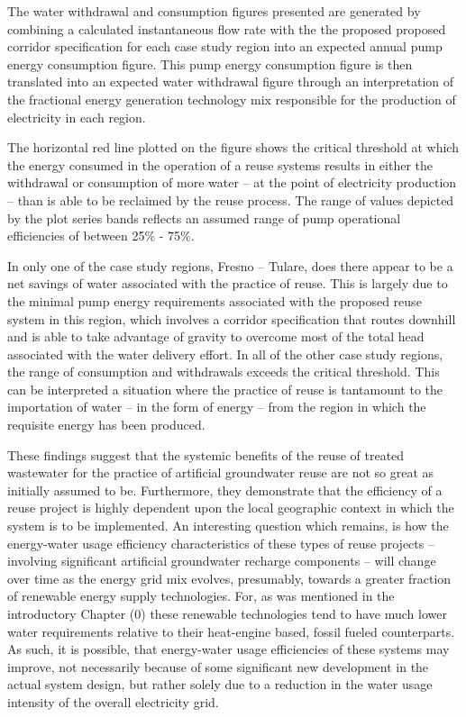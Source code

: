 The water withdrawal and consumption figures presented are generated by combining a calculated instantaneous flow rate with the the proposed proposed corridor specification for each case study region into an expected annual pump energy consumption figure. This pump energy consumption figure is then translated into an expected water withdrawal figure through an interpretation of the fractional energy generation technology mix responsible for the production of electricity in each region. 

The horizontal red line plotted on the figure shows the critical threshold at which the energy consumed in the operation of a reuse systems results in either the withdrawal or consumption of more water -- at the point of electricity production -- than is able to be reclaimed by the reuse process. The range of values depicted by the plot series bands reflects an assumed range of pump operational efficiencies of between 25\% - 75\%.

In only one of the case study regions, Fresno -- Tulare, does there appear to be a net savings of water associated with the practice of reuse. This is largely due to the minimal pump energy requirements associated with the proposed reuse system in this region, which involves a corridor specification that routes downhill and is able to take advantage of gravity to overcome most of the total head associated with the water delivery effort. In all of the other case study regions, the range of consumption and withdrawals exceeds the critical threshold. This can be interpreted a situation where the practice of reuse is tantamount to the importation of water -- in the form of energy -- from the region in which the requisite energy has been produced.

These findings suggest that the systemic benefits of the reuse of treated wastewater for the practice of artificial groundwater reuse are not so great as initially assumed to be. Furthermore, they demonstrate that the efficiency of a reuse project is highly dependent upon the local geographic context in which the system is to be implemented. An interesting question which remains, is how the energy-water usage efficiency characteristics of these types of reuse projects -- involving significant artificial groundwater recharge components -- will change over time as the energy grid mix evolves, presumably, towards a greater fraction of renewable energy supply technologies. For, as was mentioned in the introductory Chapter (0) these renewable technologies tend to have much lower water requirements relative to their heat-engine based, fossil fueled counterparts. As such, it is possible, that energy-water usage efficiencies of these systems may improve, not necessarily because of some significant new development in the actual system design, but rather solely due to a reduction in the water usage intensity of the overall electricity grid.  
    
